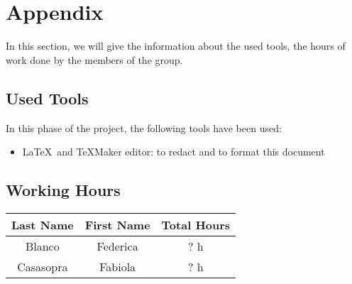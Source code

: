 \section{Appendix} \label{sec:app}
In this section, we will give the information about the used tools, the hours of work done by the members of the group.

\subsection{Used Tools} \label{tools}

In this phase of the project, the following tools have been used:

\begin{itemize}
	\item \LaTeX\ and TeXMaker editor: to redact and to format this document
\end{itemize}

\subsection{Working Hours} \label{worked}

\begin{table}[htbp]
\begin{center}
\begin{tabular}[t]{ccc}

\hline
\textbf{Last Name} & \textbf{First Name} & \textbf{Total Hours} \\
\hline
Blanco & Federica &  ? h\\
\hline
Casasopra & Fabiola &  ? h\\
\hline

\end{tabular}
\end{center}
\end{table}


